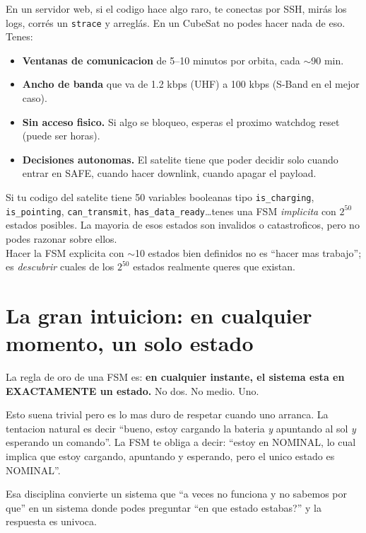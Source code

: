 \documentclass[11pt,a4paper,oneside,openright]{book}
\begin{document}
En un servidor web, si el codigo hace algo raro, te conectas por SSH,
mirás los logs, corrés un \texttt{strace} y arreglás. En un CubeSat
no podes hacer nada de eso. Tenes:

\begin{itemize}[leftmargin=2em]
  \item \textbf{Ventanas de comunicacion} de 5--10 minutos por orbita,
    cada $\sim$90 min.
  \item \textbf{Ancho de banda} que va de 1.2 kbps (UHF) a 100 kbps
    (S-Band en el mejor caso).
  \item \textbf{Sin acceso fisico.} Si algo se bloqueo, esperas el
    proximo watchdog reset (puede ser horas).
  \item \textbf{Decisiones autonomas.} El satelite tiene que poder
    decidir solo cuando entrar en SAFE, cuando hacer downlink, cuando
    apagar el payload.
\end{itemize}

\begin{cuidado}
Si tu codigo del satelite tiene 50 variables booleanas tipo
\texttt{is\_charging}, \texttt{is\_pointing}, \texttt{can\_transmit},
\texttt{has\_data\_ready}\ldots tenes una FSM \emph{implicita}
con $2^{50}$ estados posibles. La mayoria de esos estados son
invalidos o catastroficos, pero no podes razonar sobre ellos. \\

Hacer la FSM explicita con $\sim$10 estados bien definidos no es
``hacer mas trabajo''; es \emph{descubrir} cuales de los $2^{50}$
estados realmente queres que existan.
\end{cuidado}

\section{La gran intuicion: en cualquier momento, un solo estado}

La regla de oro de una FSM es: \textbf{en cualquier instante, el
sistema esta en EXACTAMENTE un estado.} No dos. No medio. Uno.

Esto suena trivial pero es lo mas duro de respetar cuando uno
arranca. La tentacion natural es decir ``bueno, estoy cargando la
bateria \emph{y} apuntando al sol \emph{y} esperando un comando''.
La FSM te obliga a decir: ``estoy en NOMINAL, lo cual implica que
estoy cargando, apuntando y esperando, pero el unico estado es
NOMINAL''.

Esa disciplina convierte un sistema que ``a veces no funciona y no
sabemos por que'' en un sistema donde podes preguntar ``en que estado
estabas?'' y la respuesta es univoca.
\end{document}
